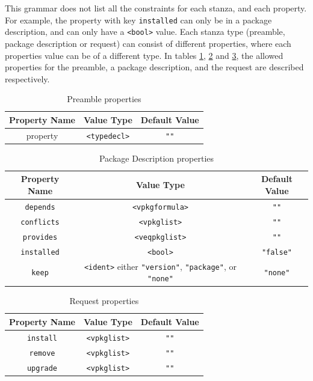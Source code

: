 This grammar does not list all the constraints for each stanza, and each property.
For example, the property with key \verb+installed+ can only be in a package description, and can only have a \verb+<bool>+ value.
Each stanza type (preamble, package description or request) can consist of different properties, where each properties value can be of a different type.
In tables \ref{formal.cudfpremableprops}, \ref{formal.cudfpdprops} and \ref{formal.cudfrequestprops}, 
the allowed properties for the preamble, a package description, and the request are described respectively.

\begin{table}[h]
\begin{tabular}{|c|c|c|}
\hline
Property Name & Value Type & Default Value \\ \hline
property & \verb+<typedecl>+ & \verb+""+ \\\hline
\end{tabular}
\caption{Preamble properties}
\label{formal.cudfpremableprops}
\end{table}

\begin{table}[h]
\begin{tabular}{|c|c|c|}
\hline
Property Name & Value Type & Default Value \\ \hline
\texttt{depends} & \texttt{<vpkgformula>} & \verb+""+ \\
\texttt{conflicts} & \texttt{<vpkglist>} & \verb+""+ \\ 
\texttt{provides} & \texttt{<veqpkglist>} & \verb+""+ \\ 
\texttt{installed} & \texttt{<bool>} & \verb+"false"+ \\ 
\texttt{keep} & \texttt{<ident>} either \texttt{"version"}, \texttt{"package"}, or \texttt{"none"} & \texttt{"none"} \\ \hline
\end{tabular}
\caption{Package Description properties}
\label{formal.cudfpdprops}
\end{table}

\begin{table}[h]
\begin{tabular}{|c|c|c|}
\hline
Property Name & Value Type & Default Value \\ \hline
\texttt{install} & \verb+<vpkglist>+ & \verb+""+ \\ 
\texttt{remove} & \verb+<vpkglist>+ & \verb+""+ \\ 
\texttt{upgrade} & \verb+<vpkglist>+ & \verb+""+ \\ \hline
\end{tabular}
\caption{Request properties}
\label{formal.cudfrequestprops}
\end{table}

